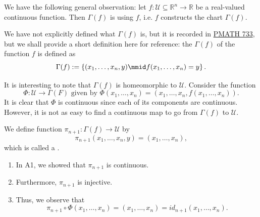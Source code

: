 \documentclass[notoc,notitlepage]{tufte-book}
\begin{document}
We have the following general observation: let $f : \mathcal{U} \subseteq \mathbb{R}^n \to \mathbb{R}$
be a real-valued continuous function. Then $\Gamma(f)$ is  using $f$, i.e. $f$
constructs the chart $\Gamma(f)$.

We have not explicitly defined what $\Gamma(f)$ is, but it is recorded
in \href{https://tex.japorized.ink/PMATH733/classnotes.pdf\#page.32}{PMATH 733}, but we shall provide a
short definition here for reference: the  $\Gamma(f)$ of the function $f$ is defined as
\begin{equation*}
  \Gamma(f) := \left\{ (x_1, \ldots, x_n, y) \mmid f(x_1, \ldots, x_n) = y \right\}.
\end{equation*}

It is interesting to note that $\Gamma(f)$ is homeomorphic to $\mathcal{U}$. Consider the function
\begin{equation*}
  \Phi : \mathcal{U} \to \Gamma(F) \text{ given by } \Phi(x_1, \ldots, x_n) = (x_1, \ldots, x_n, f(x_1, \ldots, x_n)).
\end{equation*}
It is clear that $\Phi$ is continuous since each of its components are continuous. However, it is not
as easy to find a continuous map to go from $\Gamma(f)$ to $\mathcal{U}$.

\begin{defn}[Projection]\label{defn:projection}
  We define function $\pi_{n + 1} : \Gamma(f) \to \mathcal{U}$ by
  \begin{equation*}
    \pi_{n + 1}(x_1, \ldots, x_n, y) = (x_1, \ldots, x_n),
  \end{equation*}
  which is called a .
\end{defn}

\begin{note}
  \begin{enumerate}
    \item In A1, we showed that $\pi_{n + 1}$ is continuous.
    \item Furthermore, $\pi_{n + 1}$ is injective.
    \item Thus, we observe that
      \begin{equation*}
        \pi_{n + 1} \circ \Phi(x_1, \ldots, x_n) = (x_1, \ldots, x_n) = id_{n + 1}(x_1, \ldots, x_n).
      \end{equation*}
  \end{enumerate}
\end{note}
\end{document}
